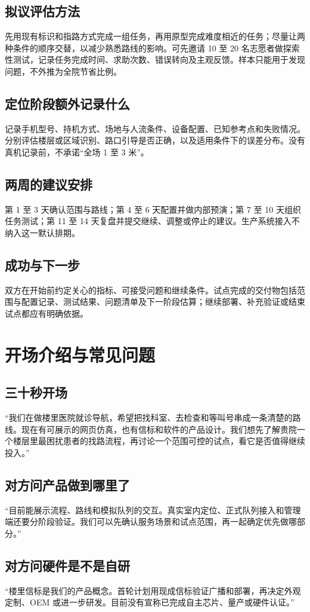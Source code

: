 \documentclass[UTF8,11pt,fontset=fandol]{ctexart}
\newcommand{\tagline}[1]{{\small\color{green}\bfseries #1}\par}
\newcommand{\page}[2]{\clearpage\tagline{#1}\section*{#2}}
\begin{document}
\subsection*{拟议评估方法}
先用现有标识和指路方式完成一组任务，再用原型完成难度相近的任务；尽量让两种条件的顺序交替，以减少熟悉路线的影响。可先邀请 10 至 20 名志愿者做探索性测试，记录任务完成时间、求助次数、错误转向及主观反馈。样本只能用于发现问题，不外推为全院节省比例。
\subsection*{定位阶段额外记录什么}
记录手机型号、持机方式、场地与人流条件、设备配置、已知参考点和失败情况。分别评估楼层或区域识别、路口引导是否正确，以及适用条件下的误差分布。没有真机记录前，不承诺“全场 1 至 3 米”。
\subsection*{两周的建议安排}
第 1 至 3 天确认范围与路线；第 4 至 6 天配置并做内部预演；第 7 至 10 天组织任务测试；第 11 至 14 天复盘并提交继续、调整或停止的建议。生产系统接入不纳入这一默认排期。
\subsection*{成功与下一步}
双方在开始前约定关心的指标、可接受问题和继续条件。试点完成的交付物包括范围与配置记录、测试结果、问题清单及下一阶段估算；继续部署、补充验证或结束试点都应有明确依据。

\page{07\quad 洽谈工具}{开场介绍与常见问题}
\subsection*{三十秒开场}
“我们在做楼里医院就诊导航，希望把找科室、去检查和等叫号串成一条清楚的路线。现在有可展示的网页仿真，也有信标和软件的产品设计。我们想先了解贵院一个楼层里最困扰患者的找路流程，再讨论一个范围可控的试点，看它是否值得继续投入。”
\subsection*{对方问产品做到哪里了}
“目前能展示流程、路线和模拟队列的交互。真实室内定位、正式队列接入和管理端还要分阶段验证。我们可以先确认服务场景和试点范围，再一起确定优先做哪部分。”
\subsection*{对方问硬件是不是自研}
“楼里信标是我们的产品概念。首轮计划用现成信标验证广播和部署，再决定外观定制、OEM 或进一步研发。目前没有宣称已完成自主芯片、量产或硬件认证。”
\end{document}
